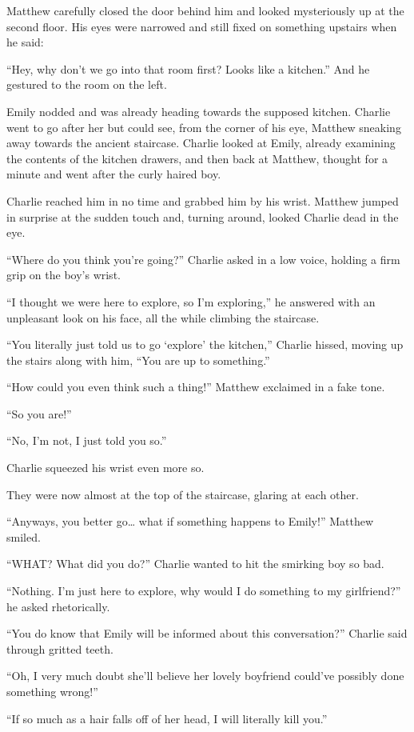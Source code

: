 Matthew carefully closed the door behind him and looked mysteriously up at the second floor. His eyes were narrowed and still fixed on something upstairs when he said:

“Hey, why don’t we go into that room first? Looks like a kitchen.” And he gestured to the room on the left.

Emily nodded and was already heading towards the supposed kitchen. Charlie went to go after her but could see, from the corner of his eye, Matthew sneaking away towards the ancient staircase. Charlie looked at Emily, already examining the contents of the kitchen drawers, and then back at Matthew, thought for a minute and went after the curly haired boy.

Charlie reached him in no time and grabbed him by his wrist. Matthew jumped in surprise at the sudden touch and, turning around, looked Charlie dead in the eye.

“Where do you think you’re going?” Charlie asked in a low voice, holding a firm grip on the boy’s wrist.

“I thought we were here to explore, so I’m exploring,” he answered with an unpleasant look on his face, all the while climbing the staircase.

“You literally just told us to go ‘explore’ the kitchen,” Charlie hissed, moving up the stairs along with him, “You are up to something.”

“How could you even think such a thing!” Matthew exclaimed in a fake tone.

“So you are!”

“No, I’m not, I just told you so.”

Charlie squeezed his wrist even more so.

They were now almost at the top of the staircase, glaring at each other.

“Anyways, you better go… what if something happens to Emily!” Matthew smiled.

“WHAT? What did you do?” Charlie wanted to hit the smirking boy so bad.

“Nothing. I’m just here to explore, why would I do something to my girlfriend?” he asked rhetorically.

“You do know that Emily will be informed about this conversation?” Charlie said through gritted teeth.

“Oh, I very much doubt she’ll believe her lovely boyfriend could’ve possibly done something wrong!”

“If so much as a hair falls off of her head, I will literally kill you.”

